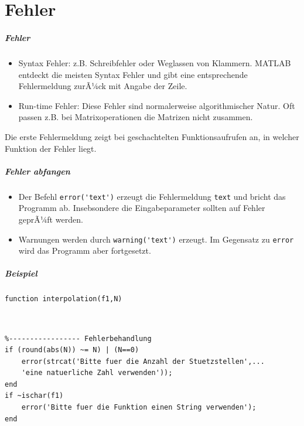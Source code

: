 \part{Fehler}
%
%
\begin{frame}[fragile]\frametitle{Fehler}
\begin{itemize}
\item \alert\alert{ Syntax Fehler}: z.B. Schreibfehler oder
  Weglassen von Klammern. MATLAB entdeckt die meisten Syntax Fehler
  und gibt eine entsprechende Fehlermeldung zurÃ¼ck mit Angabe der
  Zeile. 
\item \alert\alert{ Run-time Fehler}: Diese Fehler sind
  normalerweise algorithmischer Natur. Oft passen z.B. bei
  Matrixoperationen die Matrizen nicht zusammen. \vspace*{-0.5cm}
\end{itemize}
{\tiny Die erste Fehlermeldung zeigt bei geschachtelten Funktionsaufrufen
an, in welcher Funktion der Fehler liegt.}
\end{frame}
%
%
\begin{frame}[fragile]\frametitle{Fehler abfangen}
\begin{itemize}
\item Der Befehl \alert{ \lstinline!error('text')!} erzeugt die
  Fehlermeldung \lstinline!text! und bricht das Programm ab. Insebsondere
  die Eingabeparameter sollten auf Fehler geprÃ¼ft werden.
\item Warnungen werden durch \alert{ \lstinline!warning('text')!} erzeugt. Im
  Gegensatz zu \lstinline!error! wird das Programm aber fortgesetzt. 
\end{itemize}
\end{frame}
%
%
\begin{frame}[fragile]\frametitle{Beispiel}
\begin{lstlisting}
function interpolation(f1,N)
\end{lstlisting}
\alert{ \centering{$\cdots$}}\\
\begin{lstlisting}
%----------------- Fehlerbehandlung
if (round(abs(N)) ~= N) | (N==0)
    error(strcat('Bitte fuer die Anzahl der Stuetzstellen',...
    'eine natuerliche Zahl verwenden'));
end
if ~ischar(f1)
    error('Bitte fuer die Funktion einen String verwenden');
end
\end{lstlisting}
\alert{ \centering{$\cdots$}}\\
\end{frame}

